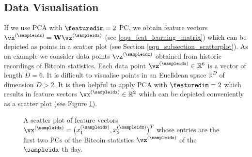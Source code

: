 \documentclass[12pt]{report}
\begin{document}
\subsection{Data Visualisation}

If we use PCA with $\featuredim=2$ PC, we obtain feature vectors 
$\vx^{(\sampleidx)} = \mathbf{W} \vz^{(\sampleidx)}$ (see \eqref{equ_feat_learning_matrix}) 
which can be depicted as points in a scatter plot (see Section \ref{equ_subsection_scatterplot}). 
As an example we consider data points $\vz^{(\sampleidx)}$ obtained  from historic recordings of 
Bitcoin statistics. Each data point $\vz^{(\sampleidx)} \in \mathbb{R}^{6}$ 
is a vector of length $D=6$. It is difficult to visualise points in an Euclidean space $\mathbb{R}^{D}$ of dimension $D > 2$. 
It is then helpful to apply PCA with $\featuredim=2$ which results in feature vectors $\vx^{(\sampleidx)} \in \mathbb{R}^{2}$ 
which can be depicted conveniently as a scatter plot (see Figure \ref{fig_scatterplot_visualization}). 

\begin{figure}[htbp]
\begin{center}
\end{center}
\caption{A scatter plot of feature vectors $\vx^{(\sampleidx)} = \big(x_{1}^{(\sampleidx)},x_{2}^{(\sampleidx)}\big)^{T}$ 
	whose entries are the first two PCs of the Bitcoin statistics $\vz^{(\sampleidx)}$ of the $\sampleidx$-th day.} 
\label{fig_scatterplot_visualization}
\end{figure}
\end{document}
